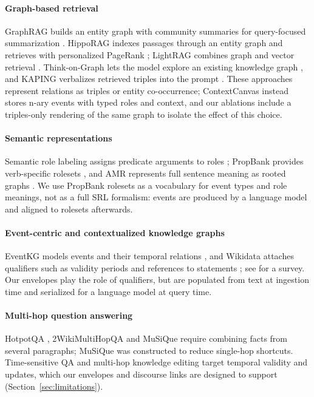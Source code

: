 \documentclass[preprint,12pt,authoryear]{elsarticle}
\begin{document}
\paragraph{Graph-based retrieval}
GraphRAG builds an entity graph with community summaries for query-focused summarization \citep{edge2024graphrag}.
HippoRAG indexes passages through an entity graph and retrieves with personalized PageRank \citep{gutierrez2024hipporag}; LightRAG combines graph and vector retrieval \citep{guo2024lightrag}.
Think-on-Graph lets the model explore an existing knowledge graph \citep{sun2024thinkongraph}, and KAPING verbalizes retrieved triples into the prompt \citep{baek2023kaping}.
These approaches represent relations as triples or entity co-occurrence; ContextCanvas instead stores n-ary events with typed roles and context, and our ablations include a triples-only rendering of the same graph to isolate the effect of this choice.

\paragraph{Semantic representations}
Semantic role labeling assigns predicate arguments to roles \citep{gildea2002srl}; PropBank provides verb-specific rolesets \citep{palmer2005propbank}, and AMR represents full sentence meaning as rooted graphs \citep{banarescu2013amr}.
We use PropBank rolesets as a vocabulary for event types and role meanings, not as a full SRL formalism: events are produced by a language model and aligned to rolesets afterwards.

\paragraph{Event-centric and contextualized knowledge graphs}
EventKG models events and their temporal relations \citep{gottschalk2018eventkg}, and Wikidata attaches qualifiers such as validity periods and references to statements \citep{vrandecic2014wikidata}; see \citet{hogan2021kg} for a survey.
Our envelopes play the role of qualifiers, but are populated from text at ingestion time and serialized for a language model at query time.

\paragraph{Multi-hop question answering}
HotpotQA \citep{yang2018hotpotqa}, 2WikiMultiHopQA \citep{ho2020twowiki} and MuSiQue \citep{trivedi2022musique} require combining facts from several paragraphs; MuSiQue was constructed to reduce single-hop shortcuts.
Time-sensitive QA \citep{chen2021timeqa} and multi-hop knowledge editing \citep{zhong2023mquake} target temporal validity and updates, which our envelopes and discourse links are designed to support (Section~\ref{sec:limitations}).
\end{document}
